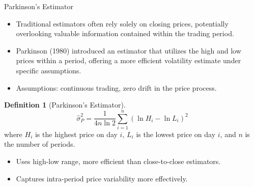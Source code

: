 \documentclass[9pt, aspectratio=169, t]{beamer}
\theoremstyle{definition}
\newtheorem{defn}{Definition}
\begin{document}
\begin{frame}{Parkinson's Estimator}

\begin{itemize}
    \item Traditional estimators often rely solely on closing prices, potentially overlooking valuable information contained within the trading period.
    \item Parkinson (1980) introduced an estimator that utilizes the high and low prices within a period, offering a more efficient volatility estimate under specific assumptions.
    \item Assumptions: continuous trading, zero drift in the price process.
\end{itemize}

\vspace{0.3cm}

\begin{defn}[Parkinson's Estimator]
\[
\hat{\sigma}_P^2 = \frac{1}{4n\ln 2}\sum_{i=1}^{n}(\ln H_i - \ln L_i)^2
\]
where $H_i$ is the highest price on day $i$, $L_i$ is the lowest price on day $i$, and $n$ is the number of periods.
\end{defn}

\vspace{0.3cm}

\begin{itemize}
    \item Uses high-low range, more efficient than close-to-close estimators.
    \item Captures intra-period price variability more effectively.
\end{itemize}

\end{frame}
\end{document}
